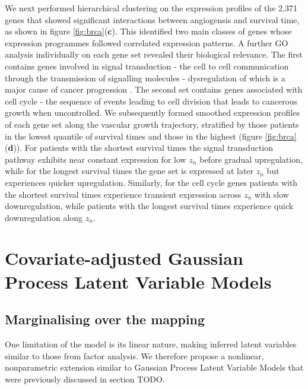 We next performed hierarchical clustering on the expression profiles of the 2,371 genes that showed significant interactions between angiogensis and survival time, as shown in figure \ref{fig:brca}(\textbf{c}). This identified two main classes of genes whose expression programmes followed correlated expression patterns. %
A further GO analysis individually on each gene set revealed their biological relevance.
The first contains genes involved in signal transduction - the cell to cell communication through the transmission of signalling molecules - dysregulation of which is a major cause of cancer progression \citep{Sever2015-ru}.
The second set contains genes associated with cell cycle - the sequence of events leading to cell division that leads to cancerous growth when uncontrolled. We subsequently formed smoothed expression profiles of each gene set along the vascular growth trajectory, stratified by those patients in the lowest quantile of survival times and those in the highest (figure \ref{fig:brca}(\textbf{d})). For patients with the shortest survival times the signal transduction pathway exhibits near constant expression for low $z_n$ before gradual upregulation, while for the longest survival times the gene set is expressed at later $z_n$ but experiences quicker upregulation. Similarly, for the cell cycle genes patients with the shortest survival times experience transient expression across $z_n$ with slow downregulation, while patients with the longest survival times experience quick downregulation along $z_n$.

\section{Covariate-adjusted Gaussian Process Latent Variable Models}


\subsection{Marginalising over the mapping}

One limitation of the model is its linear nature, making inferred latent variables similar to those from factor analysis. We therefore propose a nonlinear, nonparametric extension similar to Gaussian Process Latent Variable Models \citep{Lawrence2005-cu} that were previously discussed in section TODO.


